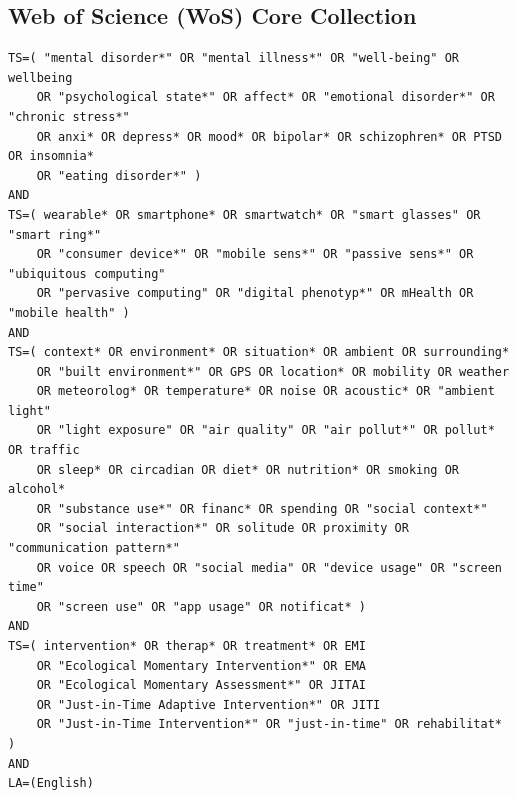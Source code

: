 \subsection{Web of Science (WoS) Core Collection}
\begin{lstlisting}[basicstyle=\ttfamily\small, breaklines=true, frame=single]
TS=( "mental disorder*" OR "mental illness*" OR "well-being" OR wellbeing 
    OR "psychological state*" OR affect* OR "emotional disorder*" OR "chronic stress*" 
    OR anxi* OR depress* OR mood* OR bipolar* OR schizophren* OR PTSD OR insomnia* 
    OR "eating disorder*" )
AND 
TS=( wearable* OR smartphone* OR smartwatch* OR "smart glasses" OR "smart ring*" 
    OR "consumer device*" OR "mobile sens*" OR "passive sens*" OR "ubiquitous computing" 
    OR "pervasive computing" OR "digital phenotyp*" OR mHealth OR "mobile health" )
AND 
TS=( context* OR environment* OR situation* OR ambient OR surrounding* 
    OR "built environment*" OR GPS OR location* OR mobility OR weather 
    OR meteorolog* OR temperature* OR noise OR acoustic* OR "ambient light" 
    OR "light exposure" OR "air quality" OR "air pollut*" OR pollut* OR traffic 
    OR sleep* OR circadian OR diet* OR nutrition* OR smoking OR alcohol* 
    OR "substance use*" OR financ* OR spending OR "social context*" 
    OR "social interaction*" OR solitude OR proximity OR "communication pattern*" 
    OR voice OR speech OR "social media" OR "device usage" OR "screen time" 
    OR "screen use" OR "app usage" OR notificat* )
AND 
TS=( intervention* OR therap* OR treatment* OR EMI 
    OR "Ecological Momentary Intervention*" OR EMA 
    OR "Ecological Momentary Assessment*" OR JITAI 
    OR "Just-in-Time Adaptive Intervention*" OR JITI 
    OR "Just-in-Time Intervention*" OR "just-in-time" OR rehabilitat* )
AND 
LA=(English)
\end{lstlisting}

